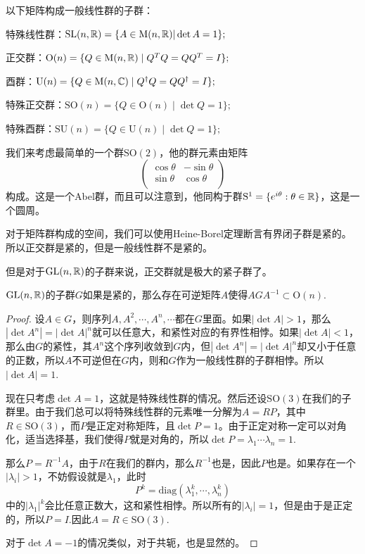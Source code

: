 \para 以下矩阵构成一般线性群的子群：

 特殊线性群：$\mathrm{SL}(n,\mathbb{R})=\{A\in \mathrm{M}(n,\mathbb{R})|\det A=1\};$

 正交群：$\mathrm{O}(n) = \{ Q \in \mathrm{M}(n,\mathbb{R}) \mid Q^T Q = Q Q^T = I \};$

 酉群：$\mathrm{U}(n) = \{ Q \in \mathrm{M}(n,\mathbb{C}) \mid Q^\dag Q = Q Q^\dag = I \};$

 特殊正交群：$\mathrm{SO}(n) =\{ Q \in \mathrm{O}(n) \mid \det Q=1 \};$

 特殊酉群：$\mathrm{SU}(n) =\{ Q \in \mathrm{U}(n) \mid \det Q=1 \};$


我们来考虑最简单的一个群$\mathrm{SO}(2)$，他的群元素由矩阵
\[
	\begin{pmatrix}
	\cos \theta&-\sin \theta\\
	\sin \theta&\cos \theta\\
	\end{pmatrix}
\]
构成。这是一个Abel群，而且可以注意到，他同构于群$\mathrm{S}^1=\{e^{i\theta}:\theta\in\mathbb{R}\}$，这是一个圆周。

\pro 对于矩阵群构成的空间，我们可以使用Heine-Borel定理断言有界闭子群是紧的。所以正交群是紧的，但是一般线性群不是紧的。

但是对于$\mathrm{GL}(n,\mathbb{R})$的子群来说，正交群就是极大的紧子群了。

\pro $\mathrm{GL}(n,\mathbb{R})$的子群$G$如果是紧的，那么存在可逆矩阵$A$使得$AGA^{-1}\subset \mathrm{O}(n)$.

\begin{proof}
设$A\in G$，则序列$A,A^2,\cdots,A^n,\cdots$都在$G$里面。如果$|\det A|>1$，那么$|\det A^n|=|\det A|^n$就可以任意大，和紧性对应的有界性相悖。如果$|\det A|<1$，那么由$G$的紧性，其$A^n$这个序列收敛到$G$内，但$|\det A^n|=|\det A|^n$却又小于任意的正数，所以$A$不可逆但在$G$内，则和$G$作为一般线性群的子群相悖。所以$|\det A|=1$.

现在只考虑$\det A=1$，这就是特殊线性群的情况。然后还设$\mathrm{SO}(3)$在我们的子群里。由于我们总可以将特殊线性群的元素唯一分解为$A=RP$，其中$R\in \mathrm{SO}(3)$，而$P$是正定对称矩阵，且$\det P=1$。由于正定对称一定可以对角化，适当选择基，我们使得$P$就是对角的，所以$\det P=\lambda_1\cdots\lambda_n=1$.

那么$P=R^{-1}A$，由于$R$在我们的群内，那么$R^{-1}$也是，因此$P$也是。如果存在一个$|\lambda_i|>1$，不妨假设就是$\lambda_1$，此时
\[
P^{k}=\mathrm{diag}(\lambda_1^k,\cdots,\lambda_n^k)
\]
中的$|\lambda_1|^k$会比任意正数大，这和紧性相悖。所以所有的$|\lambda_i|=1$，但是由于是正定的，所以$P=I$.因此$A=R\in\mathrm{SO}(3)$.

对于$\det A=-1$的情况类似，对于共轭，也是显然的。
\end{proof}


